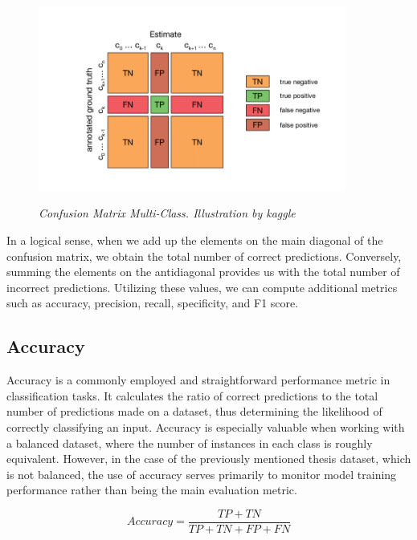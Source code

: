 \begin{figure}[H]
\begin{adjustbox}{trim={0pt 0.5cm 0pt 1cm}, clip}
\centering
\includegraphics[width=0.9\textwidth]{imatges/preliminaries/confusion-matrix.png}
\end{adjustbox}
\caption[Confusion Matrix Multi-Class]{\textit{Confusion Matrix Multi-Class. Illustration by kaggle}}
{\label{fig:confusion-matrix}}
\end{figure}

In a logical sense, when we add up the elements on the main diagonal of the confusion matrix,
we obtain the total number of correct predictions.
Conversely, summing the elements on the antidiagonal provides us with the total number of incorrect predictions.
Utilizing these values, we can compute additional metrics such as accuracy, precision, recall, specificity, and F1 score.

\subsection{Accuracy}

Accuracy is a commonly employed and straightforward performance metric in classification tasks. It calculates the ratio of correct predictions to the total number of predictions made on a dataset, thus determining the likelihood of correctly classifying an input. Accuracy is especially valuable when working with a balanced dataset, where the number of instances in each class is roughly equivalent. However, in the case of the previously mentioned thesis dataset, which is not balanced, the use of accuracy serves primarily to monitor model training performance rather than being the main evaluation metric.

\[Accuracy = \frac{TP + TN}{TP + TN + FP + FN}\]

